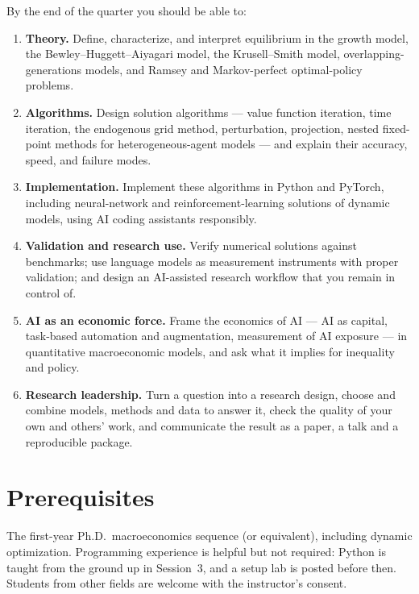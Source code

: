 \documentclass[11pt]{article}
\begin{document}
By the end of the quarter you should be able to:
\begin{enumerate}[label=\textbf{\arabic*.}]
  \item \textbf{Theory.} Define, characterize, and interpret equilibrium in the growth model, the Bewley--Huggett--Aiyagari model, the Krusell--Smith model, overlapping-generations models, and Ramsey and Markov-perfect optimal-policy problems.
  \item \textbf{Algorithms.} Design solution algorithms --- value function iteration, time iteration, the endogenous grid method, perturbation, projection, nested fixed-point methods for heterogeneous-agent models --- and explain their accuracy, speed, and failure modes.
  \item \textbf{Implementation.} Implement these algorithms in Python and PyTorch, including neural-network and reinforcement-learning solutions of dynamic models, using AI coding assistants responsibly.
  \item \textbf{Validation and research use.} Verify numerical solutions against benchmarks; use language models as measurement instruments with proper validation; and design an AI-assisted research workflow that you remain in control of.
  \item \textbf{AI as an economic force.} Frame the economics of AI --- AI as capital, task-based automation and augmentation, measurement of AI exposure --- in quantitative macroeconomic models, and ask what it implies for inequality and policy.
  \item \textbf{Research leadership.} Turn a question into a research design, choose and combine models, methods and data to answer it, check the quality of your own and others' work, and communicate the result as a paper, a talk and a reproducible package.
\end{enumerate}

\section{Prerequisites}

The first-year Ph.D.\ macroeconomics sequence (or equivalent), including dynamic optimization. Programming experience is helpful but not required: Python is taught from the ground up in Session~3, and a setup lab is posted before then. Students from other fields are welcome with the instructor's consent.

\end{document}
